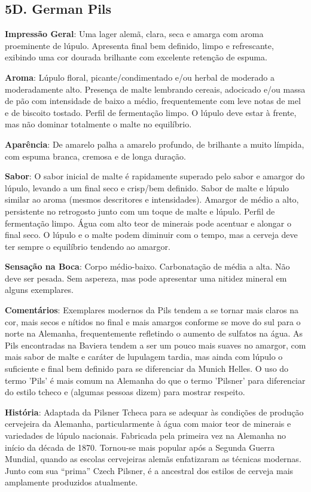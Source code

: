 \subsection*{5D. German Pils}
\textbf{Impressão Geral}: Uma lager alemã, clara, seca e amarga com aroma proeminente de lúpulo. Apresenta final bem definido, limpo e refrescante, exibindo uma cor dourada brilhante com excelente retenção de espuma.

\textbf{Aroma}: Lúpulo floral, picante/condimentado e/ou herbal de moderado a moderadamente alto. Presença de malte lembrando cereais, adocicado e/ou massa de pão com intensidade de baixo a médio, frequentemente com leve notas de mel e de biscoito tostado. Perfil de fermentação limpo. O lúpulo deve estar à frente, mas não dominar totalmente o malte no equilíbrio.

\textbf{Aparência}: De amarelo palha a amarelo profundo, de brilhante a muito límpida, com espuma branca, cremosa e de longa duração.

\textbf{Sabor}: O sabor inicial de malte é rapidamente superado pelo sabor e amargor do lúpulo, levando a um final seco e crisp/bem definido. Sabor de malte e lúpulo similar ao aroma (mesmos descritores e intensidades). Amargor de médio a alto, persistente no retrogosto junto com um toque de malte e lúpulo. Perfil de fermentação limpo. Água com alto teor de minerais pode acentuar e alongar o final seco. O lúpulo e o malte podem diminuir com o tempo, mas a cerveja deve ter sempre o equilíbrio tendendo ao amargor.

\textbf{Sensação na Boca}: Corpo médio-baixo. Carbonatação de média a alta. Não deve ser pesada. Sem aspereza, mas pode apresentar uma nitidez mineral em alguns exemplares.

\textbf{Comentários}: Exemplares modernos da Pils tendem a se tornar mais claros na cor, mais secos e nítidos no final e mais amargos conforme se move do sul para o norte na Alemanha, frequentemente refletindo o aumento de sulfatos na água. As Pils encontradas na Baviera tendem a ser um pouco mais suaves no amargor, com mais sabor de malte e caráter de lupulagem tardia, mas ainda com lúpulo o suficiente e final bem definido para se diferenciar da Munich Helles. O uso do termo 'Pils' é mais comum na Alemanha do que o termo 'Pilsner' para diferenciar do estilo tcheco e (algumas pessoas dizem) para mostrar respeito.

\textbf{História}: Adaptada da Pilsner Tcheca para se adequar às condições de produção cervejeira da Alemanha, particularmente à água com maior teor de minerais e variedades de lúpulo nacionais. Fabricada pela primeira vez na Alemanha no início da década de 1870. Tornou-se mais popular após a Segunda Guerra Mundial, quando as escolas cervejeiras alemãs enfatizaram as técnicas modernas. Junto com sua “prima” Czech Pilsner, é a ancestral dos estilos de cerveja mais amplamente produzidos atualmente.

